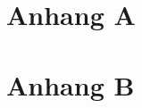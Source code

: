 \documentclass[Master,BMR,english]{BASE/twbook}
\begin{document}
\printbib                                                        %
\clearpage

\listoffigures                                                   %
\clearpage

\listoftables                                                    %
\clearpage

\listoflistings                                                  %
\clearpage



\clearpage
\appendix
\chapter{Anhang A}
\clearpage
\chapter{Anhang B}
\end{document}
